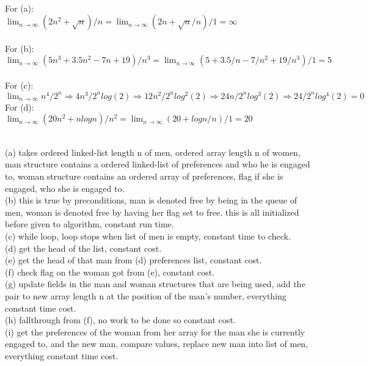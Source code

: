 \documentclass{assignment}
\begin{document}
\begin{problemlist}
\begin{answer}
\\
For (a):\\
$\lim_{n\rightarrow \infty} (2n^2 + \sqrt{n}) / n = \lim_{n\rightarrow \infty} (2n + \sqrt{n}/n)/1 = \infty$\\
\\For (b):\\
$\lim_{n\rightarrow \infty} (5n^3+3.5n^2-7n+19)/n^3 = \lim_{n\rightarrow \infty} (5+3.5/n-7/n^2+19/n^3)/1 = 5$\\
\\For (c):\\
$\lim_{n\rightarrow \infty} n^4/2^n \Rightarrow 4n^3/2^nlog(2) \Rightarrow 12n^2/2^nlog^2(2) \Rightarrow 24n/2^nlog^3(2) \Rightarrow 24/2^nlog^4(2) = 0$
\\For (d):\\
$\lim_{n\rightarrow \infty} (20n^2 + nlogn)/n^2 = \lim_{n\rightarrow \infty} (20 + logn/n)/1 = 20$\\
\end{answer}
\pbitem
\begin{problem}
\end{problem}
\begin{answer}
\\
(a) takes ordered linked-list length n of men, ordered array length n of women, man structure contains a ordered linked-list of preferences and who he is engaged to, woman structure contains an ordered array of preferences, flag if she is engaged, who she is engaged to.\\
(b) this is true by preconditions, man is denoted free by being in the queue of men, woman is denoted free by having her flag set to free. this is all initialized before given to algorithm, constant run time.\\
(c) while loop, loop stops when list of men is empty, constant time to check.\\
(d) get the head of the list, constant cost.\\
(e) get the head of that man from (d) preferences list, constant cost.\\
(f) check flag on the woman got from (e), constant cost.\\
(g) update fields in the man and woman structures that are being used, add the pair to new array length n at the position of the man's number, everything constant time cost.\\
(h) fallthrough from (f), no work to be done so constant cost.\\
(i) get the preferences of the woman from her array for the man she is currently engaged to, and the new man, compare values, replace new man into list of men, everything constant time cost.\\

\end{answer}
\end{problemlist}
\end{document}
